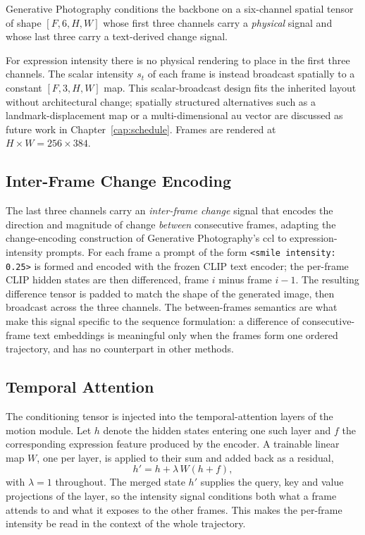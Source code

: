 Generative Photography conditions the backbone on a six-channel spatial tensor of shape
$[F, 6, H, W]$ whose first three channels carry a \emph{physical} signal and whose last three carry a text-derived change signal.

For expression intensity there is no physical rendering to place in the first three
channels. The scalar intensity $s_t$ of each frame is instead broadcast spatially to a
constant $[F, 3, H, W]$ map. This scalar-broadcast design fits the inherited layout without
architectural change; spatially structured alternatives such as a landmark-displacement
map or a multi-dimensional \gls{au} vector are discussed as future work in
Chapter~\ref{cap:schedule}. Frames are rendered at $H\times W = 256\times384$.
\subsection{Inter-Frame Change Encoding}\label{subsec:method-ccl}

The last three channels carry an \emph{inter-frame change} signal that encodes the
direction and magnitude of change \emph{between} consecutive frames, adapting the
change-encoding construction of Generative Photography's \gls{ccl} \citep{yuan2024genphoto}
to expression-intensity prompts. For each frame a prompt of the form
\texttt{<smile intensity: 0.25>} is formed and encoded with the frozen CLIP text encoder;
the per-frame CLIP hidden states are then differenced, frame $i$ minus frame $i-1$. The resulting difference tensor is padded to match the shape of the generated image, then broadcast across the three channels. The between-frames semantics are what make this signal specific to the sequence formulation: a difference of consecutive-frame text embeddings is meaningful only when the frames form one ordered trajectory, and has no counterpart in other methods.

\subsection{Temporal Attention}\label{subsec:method-merge}

The conditioning tensor is injected into the temporal-attention layers of the motion
module. Let $h$ denote the hidden states entering one such layer and $f$ the corresponding expression feature produced by the
encoder. A trainable linear map $W$, one per layer, is applied to their sum and added back
as a residual,
%
\begin{equation}\label{eq:merge}
    h' = h + \lambda\, W(h + f),
\end{equation}
%
with $\lambda = 1$ throughout. The merged state $h'$ supplies the query, key and value
projections of the layer, so the intensity signal conditions both what a frame attends to
and what it exposes to the other frames. This makes the per-frame intensity be read in the context of the whole trajectory.

